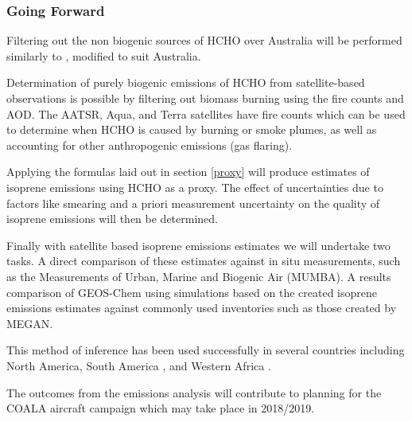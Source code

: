 \subsubsection{Going Forward}

Filtering out the non biogenic sources of HCHO over Australia will be performed similarly to \cite{Marais_2012}, modified to suit Australia.

Determination of purely biogenic emissions of HCHO from satellite-based observations is possible by filtering out biomass burning using the fire counts and AOD.
The AATSR, Aqua, and Terra satellites have fire counts which can be used to determine when HCHO is caused by burning or smoke plumes, as well as accounting for other anthropogenic emissions (gas flaring).

Applying the formulas laid out in section \ref{proxy} will produce estimates of isoprene emissions using HCHO as a proxy.
The effect of uncertainties due to factors like smearing and a priori measurement uncertainty on the quality of isoprene emissions will then be determined.

Finally with satellite based isoprene emissions estimates we will undertake two tasks.
A direct comparison of these estimates against in situ measurements, such as the Measurements of Urban, Marine and Biogenic Air (MUMBA).
A results comparison of GEOS-Chem using simulations based on the created isoprene emissions estimates against commonly used inventories such as those created by MEGAN.

This method of inference has been used successfully in several countries including North America\cite{Palmer_2003}, South America \cite{Barkley_2013}, and Western Africa \cite{Marais_2012}.


The outcomes from the emissions analysis will contribute to planning for the COALA aircraft campaign which may take place in 2018/2019.
